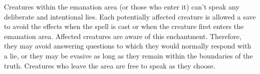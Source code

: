 \begin{multicols}{2}
\begin{small}
\noindent Creatures within the emanation area (or those who enter it) can't speak any deliberate and intentional lies. Each potentially affected creature is allowed a save to avoid the effects when the spell is cast or when the creature first enters the emanation area. Affected creatures are aware of this enchantment. Therefore, they may avoid answering questions to which they would normally respond with a lie, or they may be evasive as long as they remain within the boundaries of the truth. Creatures who leave the area are free to speak as they choose.

\end{small}
\end{multicols}
